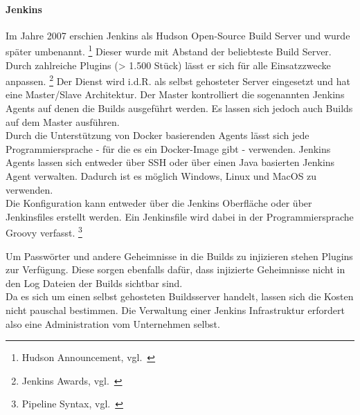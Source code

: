 \paragraph{Jenkins}\label{ci_services_tools_jenkins}

Im Jahre 2007 erschien Jenkins als Hudson Open-Source Build Server und wurde später umbenannt. \footnote{Hudson Announcement, vgl.~\cite{JENKINS_ANOUNCEMENT}}
Dieser wurde mit Abstand der beliebteste Build Server.
Durch zahlreiche Plugins (> 1.500 Stück) lässt er sich für alle Einsatzzwecke anpassen. \footnote{Jenkins Awards, vgl.~\cite{JENKINS_AWARDS}}
Der Dienst wird i.d.R. als selbst gehosteter Server eingesetzt und hat eine Master/Slave Architektur.
Der Master kontrolliert die sogenannten Jenkins Agents auf denen die Builds ausgeführt werden.
Es lassen sich jedoch auch Builds auf dem Master ausführen. \\

Durch die Unterstützung von Docker basierenden Agents lässt sich jede Programmiersprache - für die es ein Docker-Image gibt - verwenden.
Jenkins Agents lassen sich entweder über SSH oder über einen Java basierten Jenkins Agent verwalten.
Dadurch ist es möglich Windows, Linux und MacOS zu verwenden. \\

Die Konfiguration kann entweder über die Jenkins Oberfläche oder über Jenkinsfiles erstellt werden.
Ein Jenkinsfile wird dabei in der Programmiersprache Groovy verfasst. \footnote{Pipeline Syntax, vgl.~\cite{JENKINS_JENKINSFILE}}

Um Passwörter und andere Geheimnisse in die Builds zu injizieren stehen Plugins zur Verfügung.
Diese sorgen ebenfalls dafür, dass injizierte Geheimnisse nicht in den Log Dateien der Builds sichtbar sind. \\

Da es sich um einen selbst gehosteten Buildsserver handelt, lassen sich die Kosten nicht pauschal bestimmen.
Die Verwaltung einer Jenkins Infrastruktur erfordert also eine Administration vom Unternehmen selbst.
